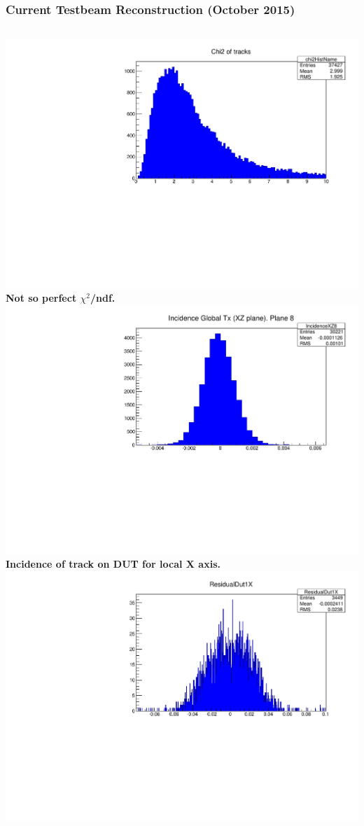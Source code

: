 \documentclass{beamer}
\begin{document}
\begin{frame}
\frametitle{Current Testbeam Reconstruction (October 2015)}
\begin{columns}[t]
\centering
\includegraphics[width=0.9\linewidth]{pics/chi_new.pdf}\\
\tiny{\textbf{Not so perfect $\chi^{2}$/ndf.}}\\
\includegraphics[width=0.9\linewidth]{pics/inc_new.pdf}\\
\tiny{\textbf{Incidence of track on DUT for local X axis. }}\\
\centering
\includegraphics[width=0.9\linewidth]{pics/Res_new.pdf}\\ 

\end{columns}
\end{frame}
\end{document}
